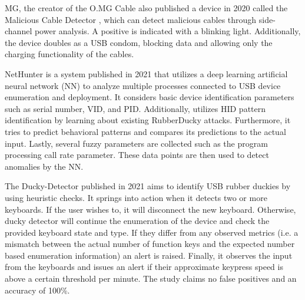 MG, the creator of the O.MG Cable also published a device in 2020 called the Malicious Cable Detector \cite{hak5MaliciousCableDetector}, which can detect malicious cables through side-channel power analysis. A positive is indicated with a blinking light. Additionally, the device doubles as a USB condom, blocking data and allowing only the charging functionality of the cables. 

NetHunter \cite{IntelligentSystemPreventing} is a system published in 2021 that utilizes a deep learning artificial neural network (NN) to analyze multiple processes connected to USB device enumeration and deployment. It considers basic device identification parameters such as serial number, VID, and PID. Additionally, utilizes HID pattern identification by learning about existing RubberDucky attacks. Furthermore, it tries to predict behavioral patterns and compares its predictions to the actual input. Lastly, several fuzzy parameters are collected such as the program processing call rate parameter. These data points are then used to detect anomalies by the NN.


The Ducky-Detector \cite{USBRubberDucky2021} published in 2021 aims to identify USB rubber duckies by using heuristic checks. It springs into action when it detects two or more keyboards. If the user wishes to, it will disconnect the new keyboard. Otherwise, ducky detector will continue the enumeration of the device and check the provided keyboard state and type. If they differ from any observed metrics (i.e. a mismatch between the actual number of function keys and the expected number based enumeration information) an alert is raised. Finally, it observes the input from the keyboards and issues an alert if their approximate keypress speed is above a certain threshold per minute. The study claims no false positives and an accuracy of 100\%. 


